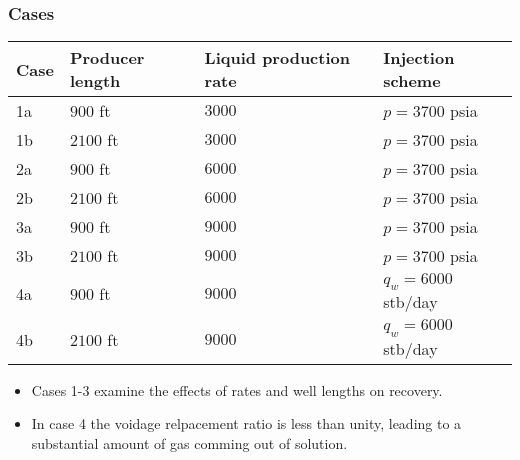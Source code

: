 \documentclass{beamer}
\begin{document}
\begin{frame}
    \frametitle{Cases}
    \footnotesize
    \begin{tabular}{llll}
        \toprule
        \textbf{Case} & \textbf{Producer length} & \textbf{Liquid production rate} & \textbf{Injection scheme} \\
        \midrule
        1a            & $900$ ft                   & $3000$                          & $p = 3700$ psia           \\
        1b            & $2100$ ft                  & $3000$                          & $p = 3700$ psia           \\
        2a            & $900$ ft                   & $6000$                          & $p = 3700$ psia           \\
        2b            & $2100$ ft                  & $6000$                          & $p = 3700$ psia           \\
        3a            & $900$ ft                   & $9000$                          & $p = 3700$ psia           \\
        3b            & $2100$ ft                  & $9000$                          & $p = 3700$ psia           \\
        4a            & $900$ ft                   & $9000$                          & $q_w = 6000$ stb/day      \\
        4b            & $2100$ ft                  & $9000$                          & $q_w = 6000$ stb/day      \\
        \bottomrule
    \end{tabular}
    \normalsize
    \begin{itemize}
        \item Cases 1-3 examine the effects of rates and well lengths on recovery.
        \item In case 4 the voidage relpacement ratio is less than unity, leading to a substantial amount of gas comming out of solution.
    \end{itemize}
\end{frame}
\end{document}
